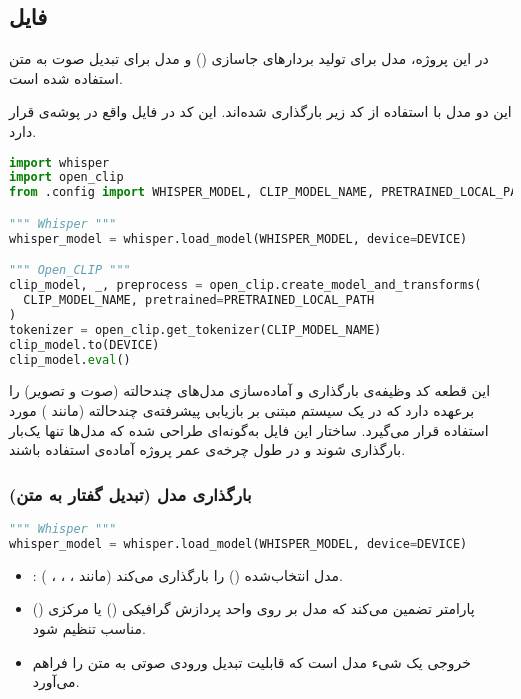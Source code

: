\documentclass{article}
\begin{document}
\subsection{فایل }

در این پروژه، مدل  برای تولید بردارهای جاسازی () و مدل  برای تبدیل صوت به متن استفاده شده است.

این دو مدل با استفاده از کد زیر بارگذاری شده‌اند. این کد در فایل  واقع در پوشه‌ی  قرار دارد.

\begin{latin}
\begin{lstlisting}[language=Python]
import whisper
import open_clip
from .config import WHISPER_MODEL, CLIP_MODEL_NAME, PRETRAINED_LOCAL_PATH, DEVICE

""" Whisper """
whisper_model = whisper.load_model(WHISPER_MODEL, device=DEVICE)

""" Open_CLIP """
clip_model, _, preprocess = open_clip.create_model_and_transforms(
  CLIP_MODEL_NAME, pretrained=PRETRAINED_LOCAL_PATH
)
tokenizer = open_clip.get_tokenizer(CLIP_MODEL_NAME)
clip_model.to(DEVICE)
clip_model.eval()
\end{lstlisting}
\end{latin}

این قطعه کد وظیفه‌ی بارگذاری و آماده‌سازی مدل‌های چندحالته (صوت و تصویر) را برعهده دارد که در یک سیستم مبتنی بر بازیابی پیشرفته‌ی چندحالته (مانند ) مورد استفاده قرار می‌گیرد. ساختار این فایل به‌گونه‌ای طراحی شده که مدل‌ها تنها یک‌بار بارگذاری شوند و در طول چرخه‌ی عمر پروژه آماده‌ی استفاده باشند.

\subsubsection{بارگذاری مدل  (تبدیل گفتار به متن)}

\begin{latin}
\begin{lstlisting}[language=Python]
""" Whisper """
whisper_model = whisper.load_model(WHISPER_MODEL, device=DEVICE)
\end{lstlisting}
\end{latin}

\begin{itemize}
    \item {}: مدل انتخاب‌شده () را بارگذاری می‌کند (مانند ، ، ، ).
    \item پارامتر  تضمین می‌کند که مدل بر روی واحد پردازش گرافیکی () یا مرکزی () مناسب تنظیم شود.
    \item خروجی  یک شیء مدل است که قابلیت تبدیل ورودی صوتی به متن را فراهم می‌آورد.
\end{itemize}
\end{document}
